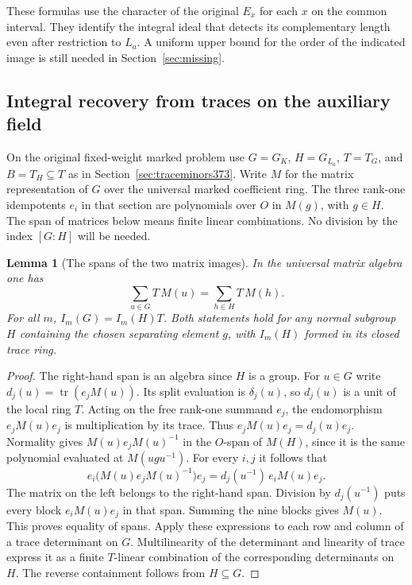 \documentclass[a4paper,11pt]{article}
\newtheorem{lemma}[proposition]{Lemma}
\theoremstyle{definition}
\theoremstyle{remark}
\numberwithin{equation}{section}
\begin{document}
These formulas use the character of the original \(E_x\)
for each \(x\) on the common interval. They identify the
integral ideal that detects its complementary length even
after restriction to \(L_a\). A uniform upper bound for
the order of the indicated image is still needed in
Section~\ref{sec:missing}.


\subsection{Integral recovery from traces on the auxiliary field}
\label{sec:restrictedtrace374}

On the original fixed-weight marked problem use \(G=G_K\),
\(H=G_{L_a}\), \(T=T_G\), and \(B=T_H\subseteq T\) as in
Section~\ref{sec:traceminors373}. Write \(M\) for the matrix
representation of \(G\) over the universal marked coefficient
ring. The three rank-one idempotents \(e_i\) in that section
are polynomials over \(O\) in \(M(g)\), with \(g\in H\).
The span of matrices below means finite linear combinations.
No division by the index \([G:H]\) will be needed.

\begin{lemma}[The spans of the two matrix images]
\label{lem:imagespan374}
In the universal matrix algebra one has
\[
                 \sum_{u\in G}T\,M(u)=\sum_{h\in H}T\,M(h).
\]
For all \(m\), \(I_m(G)=I_m(H)T\). Both statements hold for
any normal subgroup \(H\) containing the chosen separating
element \(g\), with \(I_m(H)\) formed in its closed trace ring.
\end{lemma}
\begin{proof}
The right-hand span is an algebra since \(H\) is a group.
For \(u\in G\) write \(d_j(u)=\operatorname{tr}(e_jM(u))\).
Its split evaluation is \(\delta_j(u)\), so \(d_j(u)\) is a
unit of the local ring \(T\). Acting on the free rank-one
summand \(e_j\), the endomorphism \(e_jM(u)e_j\) is
multiplication by its trace. Thus
\(e_jM(u)e_j=d_j(u)e_j\).
Normality gives \(M(u)e_jM(u)^{-1}\) in the \(O\)-span of
\(M(H)\), since it is the same polynomial evaluated at
\(M(ugu^{-1})\). For every \(i,j\) it follows that
\[
  e_i\bigl(M(u)e_jM(u)^{-1}\bigr)e_j
             =d_j(u^{-1})\, e_i M(u)e_j .
\]
The matrix on the left belongs to the right-hand span.
Division by \(d_j(u^{-1})\) puts every block \(e_i M(u)e_j\)
in that span. Summing the nine blocks gives \(M(u)\).
This proves equality of spans. Apply these expressions to
each row and column of a trace determinant on \(G\).
Multilinearity of the determinant and linearity of trace
express it as a finite \(T\)-linear combination of the
corresponding determinants on \(H\). The reverse containment
follows from \(H\subseteq G\).
\end{proof}
\end{document}
